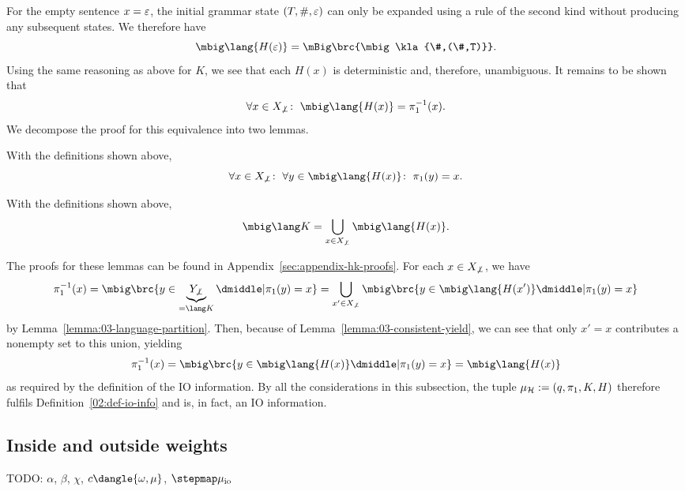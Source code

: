 For the empty sentence $x=\varepsilon$, the initial grammar state $(T,\#,\varepsilon)$ can
only be expanded using a rule of the second kind without producing any subsequent states.
We therefore have
\[
 \mbig\lang{H(\eps)} = \mBig\brc{\mbig\kla{\#,(\#,T)}}.
\]
%
Using the same reasoning as above for $K$, we see that each $H(x)$ is
deterministic and, therefore, unambiguous. It remains to be shown that
\[
 \forall x\in X_{\not\bot}\colon\;
 \mbig\lang{H(x)} = \pi_1^{-1}(x).
\]
We decompose the proof for this equivalence into two lemmas.

\begin{lemma}\label{lemma:03-consistent-yield}
 With the definitions shown above,
 \[
  \forall x\in X_{\not\bot}\colon\;
  \forall y\in \mbig\lang{H(x)}\colon\;
  \pi_1(y) = x.
 \]
\end{lemma}

\begin{lemma}\label{lemma:03-language-partition}
 With the definitions shown above,
 \[
  \mbig\lang K = \bigcup_{x\in X_{\not\bot}} \mbig\lang{H(x)}.
 \]
\end{lemma}

The proofs for these lemmas can be found in Appendix~\ref{sec:appendix-hk-proofs}. For each $x\in X_{\not\bot}$, we have
\[
 \pi_1^{-1}(x)
 = \mbig\brc{y\in \underbrace{Y_{\not\bot}}_{=\lang K} \dmiddle| \pi_1(y) = x}
 = \bigcup_{x'\in X_{\not\bot}} \mbig\brc{y\in\mbig\lang{H(x')} \dmiddle| \pi_1(y) = x}
\]
by Lemma~\ref{lemma:03-language-partition}. Then, because of
Lemma~\ref{lemma:03-consistent-yield}, we can see that only $x'=x$ contributes
a nonempty set to this union, yielding
\[
 \pi_1^{-1}(x) = \mbig\brc{y\in\mbig\lang{H(x)} \dmiddle| \pi_1(y) = x} = \mbig\lang{H(x)}
\]
as required by the definition of the IO information. By all the considerations
in this subsection, the tuple $\mu_\mathcal H := (q,\pi_1,K,H)$ therefore fulfils
Definition~\ref{02:def-io-info} and is, in fact, an IO information.

\subsection{Inside and outside weights}

{\color{red}TODO: $\alpha$, $\beta$, $\chi$, $c\dangle{\omega,\mu}$, $\stepmap\mu_\mathrm{io}$}
